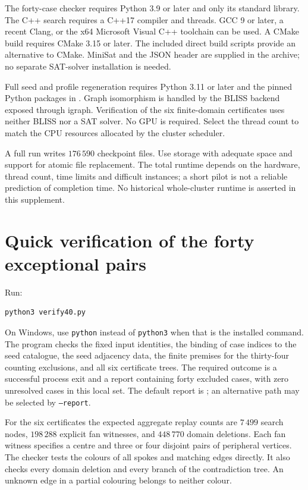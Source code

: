 \documentclass[11pt]{article}
\newcommand{\file}[1]{\path{#1}}
\begin{document}
The forty-case checker requires Python 3.9 or later and only its standard
library. The C++ search requires a C++17 compiler and threads. GCC 9 or
later, a recent Clang, or the x64 Microsoft Visual C++ toolchain can be
used. A CMake build requires CMake 3.15 or later. The included direct
build scripts provide an alternative to CMake. MiniSat and the JSON
header are supplied in the archive; no separate SAT-solver installation
is needed.

Full seed and profile regeneration requires Python 3.11 or later and
the pinned Python packages in \file{tools/requirements.txt}. Graph isomorphism is
handled by the BLISS backend exposed through igraph. Verification of
the six finite-domain certificates uses neither BLISS nor a SAT solver.
No GPU is required. Select the thread count to match the CPU resources
allocated by the cluster scheduler.

A full run writes $176\,590$ checkpoint files. Use storage with adequate
space and support for atomic file replacement. The total runtime depends
on the hardware, thread count, time limits and difficult instances; a
short pilot is not a reliable prediction of completion time. No
historical whole-cluster runtime is asserted in this supplement.

\section{Quick verification of the forty exceptional pairs}
\label{sec:quick}

\begin{minipage}{\linewidth}
Run:
\begingroup\footnotesize
\begin{verbatim}
python3 verify40.py
\end{verbatim}
\endgroup
\end{minipage}

On Windows, use \texttt{python} instead of \texttt{python3} when that is
the installed command. The program checks the fixed input identities,
the binding of case indices to the seed catalogue, the seed adjacency
data, the finite premises for the thirty-four counting exclusions, and
all six certificate trees. The required outcome is a successful process
exit and a report containing forty excluded cases, with zero unresolved
cases in this local set. The default report is
\file{results/verified40.json}; an alternative path may be selected by
\texttt{--report}.

For the six certificates the expected aggregate replay counts are
$7\,499$ search nodes, $198\,288$ explicit fan witnesses, and
$448\,770$ domain deletions. Each fan witness specifies a centre and
three or four disjoint pairs of peripheral vertices. The checker tests
the colours of all spokes and matching edges directly. It also checks
every domain deletion and every branch of the contradiction tree.
An unknown edge in a partial colouring belongs to neither colour.
\end{document}
